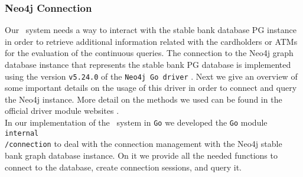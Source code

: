 \subsubsection*{Neo4j Connection}\label{Neo4j-connection}
Our \DPATM\ system needs a way to interact with the stable bank database PG instance in order to retrieve additional information related with the cardholders or ATMs for the evaluation of the continuous queries. The connection to the Neo4j graph database instance that represents the stable bank PG database is implemented using the version \texttt{v5.24.0} of the \texttt{Neo4j Go driver} \cite{neo4j-go-driver-v5240}. Next we give an overview of some important details on the usage of this driver in order to connect and query the Neo4j instance. More detail on the methods we used can be found in the official driver module websites \cite{neo4j-go-neo4j_go_driver, neo4j-go-neo4j_go_manual}.\\

In our implementation of the \DPATM\ system in \texttt{Go} we developed the \texttt{Go} module \texttt{internal\\/connection} to deal with the connection management with the Neo4j stable bank graph database instance.
On it we provide all the needed functions to connect to the database, create connection sessions, and query it. 



